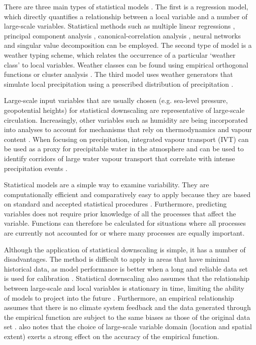 \documentclass{sfuthesis}
\begin{document}
There are three main types of statistical models \citep{Fowler2007}. The first is a regression model, which directly quantifies a relationship between a local variable and a number of large-scale variables. Statistical methods such as multiple linear regressions \citep{Hanssen-Bauer1998}, principal component analysis \citep{Kidson1998}, canonical-correlation analysis \citep{Busuioc2001}, neural networks \citep{Zorita1999} and singular value decomposition \citep{Widmann2003} can be employed.  The second type of model is a weather typing scheme, which relates the occurrence of a particular `weather class' to local variables. Weather classes can be found using empirical orthogonal functions or cluster analysis \citep{Fowler2007}. The third model uses weather generators that simulate local precipitation using a prescribed distribution of precipitation \citep{Fowler2007}. 

Large-scale input variables that are usually chosen (e.g. sea-level pressure, geopotential heights) for statistical downscaling are representative of large-scale circulation. Increasingly, other variables such as humidity are being incorporated into analyses to account for mechanisms that rely on thermodynamics and vapour content \citep{Fowler2007}. When focusing on precipitation, integrated vapour transport (IVT) can be used as a proxy for precipitable water in the atmosphere and can be used to identify corridors of large water vapour transport that correlate with intense precipitation events \citep{Neiman2008}. 

Statistical models are a simple way to examine variability. They are computationally efficient and comparatively easy to apply because they are based on standard and accepted statistical procedures \citep{Fowler2007}. Furthermore, predicting variables does not require prior knowledge of all the processes that affect the variable. Functions can therefore be calculated for situations where all processes are currently not accounted for or where many processes are equally important. 

Although the application of statistical downscaling is simple, it has a number of disadvantages. The method is difficult to apply in areas that have minimal historical data, as model performance is better when a long and reliable data set is used for calibration \citep{Fowler2007}. Statistical downscaling also assumes that the relationship between large-scale and local variables is stationary in time, limiting the ability of models to project into the future \citep{Fowler2007}. Furthermore, an empirical relationship assumes that there is no climate system feedback and the data generated through the empirical function are subject to the same biases as those of the original data set \citep{Fowler2007}. \cite{Wilby2000} also notes that the choice of large-scale variable domain (location and spatial extent) exerts a strong effect on the accuracy of the empirical function.
\end{document}
